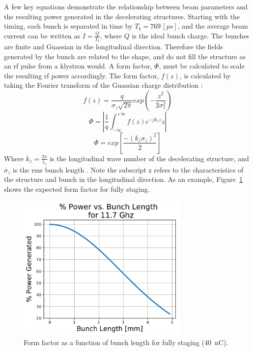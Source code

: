 A few key equations demonstrate the relationship between beam 
parameters and the resulting power generated in the decelerating structures.  
Starting with the timing, each bunch is separated
in time by $T_{b}=769\,[ps]$, and the average beam current can be written as $I=\frac{Q}{T_{b}}$, 
where $Q$ is the ideal bunch charge.
The bunches are finite and Guassian in the longitudinal direction. Therefore the fields 
generated by the bunch are related to the shape, and do not fill the structure as an
rf pulse from a klystron would.  A form factor, $\Phi$, 
must be calculated to scale the resulting rf power accordingly. 
The form factor, $f(z)$, is calculated 
by taking the Fourier transform of the Guassian charge distribution \cite{PETSeq}: 
\begin{equation}
f\left(z\right) = \frac{q}{\sigma_z \sqrt{2\pi}}exp\left(-\frac{z^2}{2\sigma^2_z}\right)
\end{equation}   
\begin{equation}
\Phi = \left|\frac{1}{q}\int_{-\infty}^{+\infty}f\left(z\right)e^{-jk_z z}z\right|
\end{equation}
\begin{equation}
\Phi=exp\left[\frac{-(k_{z}\sigma_{z})^{2}}{2}\right]
\end{equation}
Where $k_{z}=\frac{2\pi}{\lambda_{z}}$ is the longitudinal wave number
of the decelerating structure, and $\sigma_{z}$ is the rms bunch length \cite{PETSeq}. 
Note the subscript z refers to the characteristics of the structure and bunch in the longitudinal
direction. 
As an example, Figure~\ref{fig:form} shows the expected form factor for fully staging.
\begin{figure}
	\centering
	\includegraphics[width=0.75\textwidth]{images/formfactorsqrd}
	\caption{Form factor as a function of bunch length for fully staging (\SI{40}{nC}).}
	\label{fig:form}
\end{figure}

